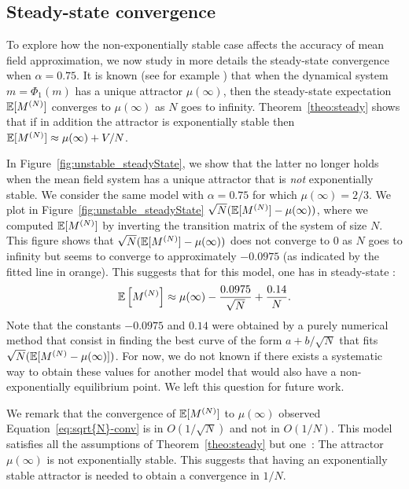 \documentclass{elsarticle}
\begin{document}
\subsection{Steady-state convergence}

To explore how the non-exponentially stable case affects the accuracy
of mean field approximation, we now study in more details the
steady-state convergence when $\alpha=0.75$. It is known (see for
example \cite[Corollary~14]{gastgaujalDEDS}) that when the dynamical
system $m=\Phi_1(m)$ has a unique attractor $\mu(\infty)$, then the
steady-state expectation $\esp{\MN}$ converges to $\mu(\infty)$ as $N$
goes to infinity. Theorem~\ref{theo:steady} shows that if in addition
the attractor is exponentially stable then
$\esp{\MN}\approx \mu(\infty)+V/N$.

In Figure~\ref{fig:unstable_steadyState}, we show that the latter no longer
holds when the mean field system has a unique attractor that is {\em not}
exponentially stable. We consider the same model with $\alpha=0.75$
for which $\mu(\infty)=2/3$. We plot in
Figure~\ref{fig:unstable_steadyState}
$\sqrt{N}(\esp{\MN}-\mu(\infty))$, where we computed $\esp{\MN}$ by
inverting the transition matrix of the system of size $N$. This figure
shows that $\sqrt{N}(\esp{\MN}-\mu(\infty))$ does not converge to $0$
as $N$ goes to infinity but seems to converge to approximately
$-0.0975$ (as indicated by the fitted line in orange). This suggests
that for this model, one has in steady-state :
\begin{align}
  \esp{\MN}\approx\mu(\infty)-\frac{0.0975}{\sqrt{N}}+\frac{0.14}{N}.
  \label{eq:sqrt{N}-conv}
\end{align}
Note that the constants $-0.0975$ and $0.14$ were obtained by a purely
numerical method that consist in finding the best curve of the form
$a+b/\sqrt{N}$ that fits $\sqrt{N}(\esp{\MN-\mu(\infty)})$. For now,
we do not known if there exists a systematic way to obtain these
values for another model that would also have a non-exponentially
equilibrium point. We left this question for future work. 


We remark that the convergence of $\esp{\MN}$ to $\mu(\infty)$
observed Equation~\eqref{eq:sqrt{N}-conv} is in $O(1/\sqrt{N})$ and
not in $O(1/N)$. This model satisfies all the assumptions of
Theorem~\ref{theo:steady} but one~: The attractor $\mu(\infty)$ is not
exponentially stable. This suggests that having an exponentially
stable attractor is needed to obtain a convergence in $1/N$.  
\end{document}
